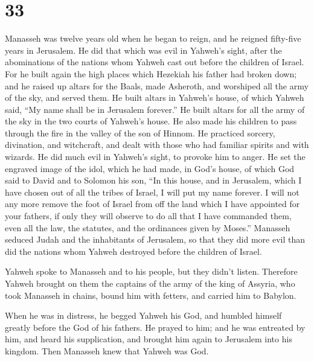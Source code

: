\hypertarget{section-32}{%
\section{33}\label{section-32}}

 Manasseh was twelve years old when he began to reign, and
he reigned fifty-five years in Jerusalem.  He did that
which was evil in Yahweh's sight, after the abominations of the nations
whom Yahweh cast out before the children of Israel.  For
he built again the high places which Hezekiah his father had broken
down; and he raised up altars for the Baals, made Asheroth, and
worshiped all the army of the sky, and served them.  He
built altars in Yahweh's house, of which Yahweh said, ``My name shall be
in Jerusalem forever.''  He built altars for all the army
of the sky in the two courts of Yahweh's house.  He also
made his children to pass through the fire in the valley of the son of
Hinnom. He practiced sorcery, divination, and witchcraft, and dealt with
those who had familiar spirits and with wizards. He did much evil in
Yahweh's sight, to provoke him to anger.  He set the
engraved image of the idol, which he had made, in God's house, of which
God said to David and to Solomon his son, ``In this house, and in
Jerusalem, which I have chosen out of all the tribes of Israel, I will
put my name forever.  I will not any more remove the foot
of Israel from off the land which I have appointed for your fathers, if
only they will observe to do all that I have commanded them, even all
the law, the statutes, and the ordinances given by Moses.''
 Manasseh seduced Judah and the inhabitants of Jerusalem,
so that they did more evil than did the nations whom Yahweh destroyed
before the children of Israel.

 Yahweh spoke to Manasseh and to his people, but they
didn't listen.  Therefore Yahweh brought on them the
captains of the army of the king of Assyria, who took Manasseh in
chains, bound him with fetters, and carried him to Babylon.

 When he was in distress, he begged Yahweh his God, and
humbled himself greatly before the God of his fathers. 
He prayed to him; and he was entreated by him, and heard his
supplication, and brought him again to Jerusalem into his kingdom. Then
Manasseh knew that Yahweh was God.

